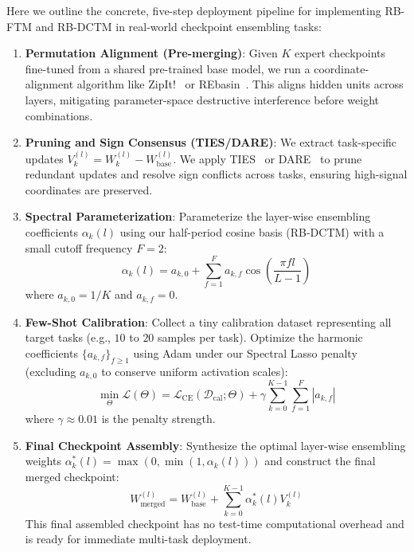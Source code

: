 Here we outline the concrete, five-step deployment pipeline for implementing RB-FTM and RB-DCTM in real-world checkpoint ensembling tasks:

\begin{enumerate}
    \item \textbf{Permutation Alignment (Pre-merging)}: Given $K$ expert checkpoints fine-tuned from a shared pre-trained base model, we run a coordinate-alignment algorithm like ZipIt!~\cite{stoica2023zipit} or REbasin~\cite{ainsworth2022git}. This aligns hidden units across layers, mitigating parameter-space destructive interference before weight combinations.
    \item \textbf{Pruning and Sign Consensus (TIES/DARE)}: We extract task-specific updates $V_k^{(l)} = W_k^{(l)} - W_{\text{base}}^{(l)}$. We apply TIES~\cite{yadav23ties} or DARE~\cite{yu23dare} to prune redundant updates and resolve sign conflicts across tasks, ensuring high-signal coordinates are preserved.
    \item \textbf{Spectral Parameterization}: Parameterize the layer-wise ensembling coefficients $\alpha_k(l)$ using our half-period cosine basis (RB-DCTM) with a small cutoff frequency $F = 2$:
    \begin{equation}
        \alpha_k(l) = a_{k,0} + \sum_{f=1}^F a_{k,f} \cos\left( \frac{\pi f l}{L-1} \right)
    \end{equation}
    where $a_{k,0} = 1/K$ and $a_{k,f} = 0$.
    \item \textbf{Few-Shot Calibration}: Collect a tiny calibration dataset representing all target tasks (e.g., $10$ to $20$ samples per task). Optimize the harmonic coefficients $\{a_{k,f}\}_{f \ge 1}$ using Adam under our Spectral Lasso penalty (excluding $a_{k,0}$ to conserve uniform activation scales):
    \begin{equation}
        \min_{\Theta} \mathcal{L}(\Theta) = \mathcal{L}_{\text{CE}}(\mathcal{D}_{\text{cal}}; \Theta) + \gamma \sum_{k=0}^{K-1} \sum_{f=1}^F |a_{k,f}|
    \end{equation}
    where $\gamma \approx 0.01$ is the penalty strength.
    \item \textbf{Final Checkpoint Assembly}: Synthesize the optimal layer-wise ensembling weights $\alpha^*_k(l) = \max(0, \min(1, \alpha_k(l)))$ and construct the final merged checkpoint:
    \begin{equation}
        W_{\text{merged}}^{(l)} = W_{\text{base}}^{(l)} + \sum_{k=0}^{K-1} \alpha^*_k(l) V_k^{(l)}
    \end{equation}
    This final assembled checkpoint has no test-time computational overhead and is ready for immediate multi-task deployment.
\end{enumerate}


